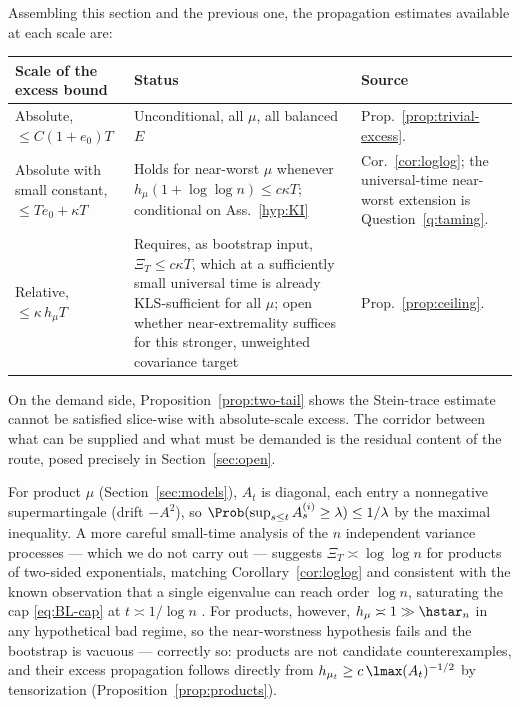 \documentclass[../../main.tex]{subfiles}
\begin{document}
\begin{remark}
\label{rem:supply}
Assembling this section and the previous one, the propagation estimates available at each scale
are:
\begin{center}
\begin{tabularx}{\textwidth}{@{}>{\raggedright\arraybackslash}p{}>{\raggedright\arraybackslash}p{}Y@{}}
\toprule
Scale of the excess bound & Status & Source \\
\midrule
Absolute, $\le C(1+e_0)T$ & Unconditional, all $\mu$, all balanced $E$ &
Prop.~\ref{prop:trivial-excess}. \\
\addlinespace
Absolute with small constant, $\le Te_0+\kappa T$ & Holds for near-worst $\mu$ whenever
$h_\mu(1+\log\log n)\le c\kappa T$; conditional on Ass.~\ref{hyp:KI} &
Cor.~\ref{cor:loglog}; the universal-time near-worst extension is Question~\ref{q:taming}. \\
\addlinespace
Relative, $\le\kappa\,h_\mu T$ & Requires, as bootstrap input, $\Xi_T\le c\kappa T$,
which at a sufficiently small universal time is already KLS-sufficient for all $\mu$; open
whether near-extremality suffices for this stronger, unweighted covariance target &
Prop.~\ref{prop:ceiling}. \\
\bottomrule
\end{tabularx}
\end{center}
On the demand side, Proposition~\ref{prop:two-tail} shows the Stein-trace estimate cannot be
satisfied slice-wise with absolute-scale excess. The corridor between what can be supplied and
what must be demanded is the residual content of the route, posed precisely in
Section~\ref{sec:open}.
\end{remark}

\begin{remark}
\label{rem:products-bootstrap}
For product $\mu$ (Section~\ref{sec:models}), $A_t$ is diagonal, each entry a nonnegative
supermartingale (drift $-A^2$), so $\Prob(\sup_{s\le t}A^{(i)}_s\ge\lambda)\le1/\lambda$ by the
maximal inequality. A more careful small-time analysis of the $n$ independent variance
processes --- which we do not carry out --- suggests $\Xi_T\asymp\log\log n$ for products of
two-sided exponentials, matching Corollary~\ref{cor:loglog} and consistent with the known
observation that a single eigenvalue can reach order $\log n$, saturating the cap
\eqref{eq:BL-cap} at $t\asymp1/\log n$ \cite{Chen2021,KlartagLehec2022Polylog}. For products,
however, $h_\mu\asymp1\gg\hstar_n$ in any hypothetical bad regime, so the near-worstness
hypothesis fails and the bootstrap is vacuous --- correctly so: products are not candidate
counterexamples, and their excess propagation follows directly from
$h_{\mu_t}\ge c\,\lmax(A_t)^{-1/2}$ by tensorization (Proposition~\ref{prop:products}).
\end{remark}
\end{document}
